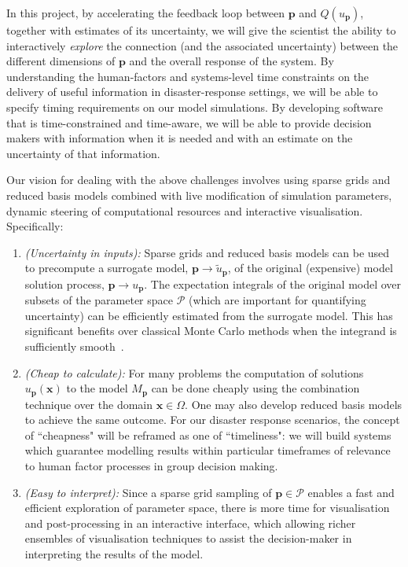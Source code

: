 \documentclass[a4paper,fontsize=12pt]{scrartcl}
\begin{document}
In this project, by accelerating the feedback loop between $\mathbf{p}$ and
$Q(u_{\mathbf{p}})$, together with estimates of its uncertainty, we will give
the scientist the ability to interactively \emph{explore} the
connection (and the associated uncertainty) between the different
dimensions of $\mathbf{p}$ and the overall response of the system.
By understanding the human-factors and systems-level time constraints on the delivery of useful information in
disaster-response settings, we will be able to specify timing requirements on our model simulations.
By developing software that is time-constrained and time-aware, we will be able to provide decision makers
with information when it is needed and with an estimate on the uncertainty of that information. 


Our vision for dealing with the above challenges
involves using sparse grids and reduced basis models 
combined with live modification
of simulation parameters, dynamic steering of computational resources and
interactive visualisation. Specifically:
\begin{enumerate}
\item \emph{(Uncertainty in inputs):} Sparse grids and reduced basis models can be used
  to precompute a surrogate model, $\mathbf{p} \rightarrow \tilde{u}_{\mathbf{p}}$, of the original
  (expensive) model solution process, $\mathbf{p} \rightarrow {u}_{\mathbf{p}}$.
  The expectation integrals of the original model over subsets of the
  parameter space $\mathcal{P}$ (which are important for quantifying
  uncertainty) can be efficiently estimated from the
  surrogate model. This has
  significant benefits over classical Monte Carlo methods when the
  integrand is sufficiently
  smooth~\parencite{JakemanRoberts2013,FranzelinDiehlPfluger2014}.

\item \emph{(Cheap to calculate):} For many problems the computation of solutions 
  $u_{\mathbf{p}}(\mathbf{x})$ to the model $M_{\mathbf{p}}$ can be done 
  cheaply using the combination technique over the domain
  $\mathbf{x}\in\Omega$.
  One may also develop reduced basis models to achieve the same outcome. For our disaster response scenarios, the concept of ``cheapness" will be reframed as one of ``timeliness": we will build systems which guarantee modelling results within particular timeframes of relevance to human factor processes in group decision making.

\item \emph{(Easy to interpret):} Since a sparse grid sampling of $\mathbf{p}\in\mathcal{P}$ enables a fast 
  and efficient exploration of parameter space, there is more time for
  visualisation and post-processing in an interactive interface, which
  allowing richer ensembles of visualisation techniques to assist the
  decision-maker in interpreting the results of the model.
\end{enumerate}
\end{document}
